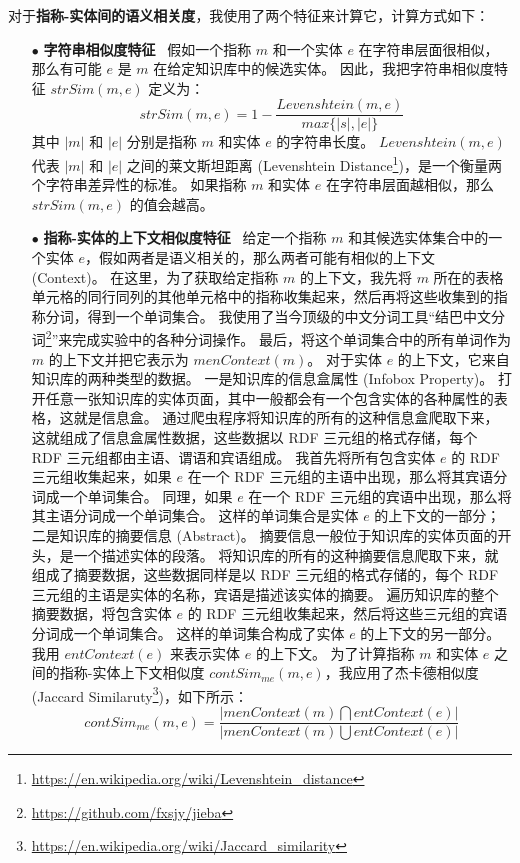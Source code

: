 对于\textbf{指称-实体间的语义相关度}，我使用了两个特征来计算它，计算方式如下：
\begin{itemize}
	\item[$\bullet$] \textbf{字符串相似度特征} \ 
	假如一个指称 $m$ 和一个实体 $e$ 在字符串层面很相似，那么有可能 $e$ 是 $m$ 在给定知识库中的候选实体。
	因此，我把字符串相似度特征 $strSim(m,e)$ 定义为：
	\begin{equation}
	strSim(m,e)=1-\frac{Levenshtein(m,e)}{max\{|s|, |e|\}}
	\label{strsim}
	\end{equation}
	其中 $|m|$ 和 $|e|$ 分别是指称 $m$ 和实体 $e$ 的字符串长度。
	$Levenshtein(m,e)$ 代表 $|m|$ 和 $|e|$ 之间的莱文斯坦距离 (Levenshtein Distance\footnote{\url{https://en.wikipedia.org/wiki/Levenshtein_distance}})，是一个衡量两个字符串差异性的标准。
	如果指称 $m$ 和实体 $e$ 在字符串层面越相似，那么 $strSim(m,e)$ 的值会越高。
	\item[$\bullet$] \textbf{指称-实体的上下文相似度特征} \ 
	给定一个指称 $m$ 和其候选实体集合中的一个实体 $e$，假如两者是语义相关的，那么两者可能有相似的上下文 (Context)。
	在这里，为了获取给定指称 $m$ 的上下文，我先将 $m$ 所在的表格单元格的同行同列的其他单元格中的指称收集起来，然后再将这些收集到的指称分词，得到一个单词集合。
	我使用了当今顶级的中文分词工具``结巴中文分词\footnote{\url{https://github.com/fxsjy/jieba}}''来完成实验中的各种分词操作。
	最后，将这个单词集合中的所有单词作为 $m$ 的上下文并把它表示为 $menContext(m)$。
	对于实体 $e$ 的上下文，它来自知识库的两种类型的数据。
	一是知识库的信息盒属性 (Infobox Property)。
	打开任意一张知识库的实体页面，其中一般都会有一个包含实体的各种属性的表格，这就是信息盒。
	通过爬虫程序将知识库的所有的这种信息盒爬取下来，这就组成了信息盒属性数据，这些数据以 RDF\cite{munoz2014using} 三元组的格式存储，每个 RDF 三元组都由主语、谓语和宾语组成。
	我首先将所有包含实体 $e$ 的 RDF 三元组收集起来，如果 $e$ 在一个 RDF 三元组的主语中出现，那么将其宾语分词成一个单词集合。
	同理，如果 $e$ 在一个 RDF 三元组的宾语中出现，那么将其主语分词成一个单词集合。
	这样的单词集合是实体 $e$ 的上下文的一部分；
	二是知识库的摘要信息 (Abstract)。
	摘要信息一般位于知识库的实体页面的开头，是一个描述实体的段落。
	将知识库的所有的这种摘要信息爬取下来，就组成了摘要数据，这些数据同样是以 RDF 三元组的格式存储的，每个 RDF 三元组的主语是实体的名称，宾语是描述该实体的摘要。
	遍历知识库的整个摘要数据，将包含实体 $e$ 的 RDF 三元组收集起来，然后将这些三元组的宾语分词成一个单词集合。
	这样的单词集合构成了实体 $e$ 的上下文的另一部分。
	我用 $entContext(e)$ 来表示实体 $e$ 的上下文。
	为了计算指称 $m$ 和实体 $e$ 之间的指称-实体上下文相似度 $contSim_{me}(m,e)$，我应用了杰卡德相似度 (Jaccard Similaruty\footnote{\url{https://en.wikipedia.org/wiki/Jaccard_similarity}})，如下所示：
	\begin{equation}
	contSim_{me}(m,e)=\frac{|menContext(m)\bigcap{entContext(e)}|}{|menContext(m)\bigcup{entContext(e)}|}
	\end{equation}
\end{itemize}
